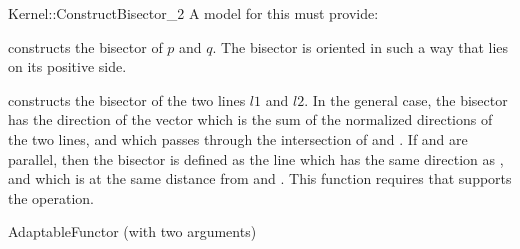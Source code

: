 \begin{ccRefFunctionObjectConcept}{Kernel::ConstructBisector_2}
A model for this must provide:


{constructs the bisector of $p$ and $q$.
The bisector is oriented in such a way that  lies on its
positive side. }

{constructs the bisector of the two lines $l1$ and $l2$.
In the general case, the bisector has the direction of the vector which
is the sum of the normalized directions of the two lines, and which passes
through the intersection of  and .
If  and  are parallel, then the bisector is defined as the line
which has the same direction as , and which is at the same distance
from  and .
This function requires that  supports the 
operation.}

\ccRefines
AdaptableFunctor (with two arguments)

\ccSeeAlso
{}

\end{ccRefFunctionObjectConcept}
